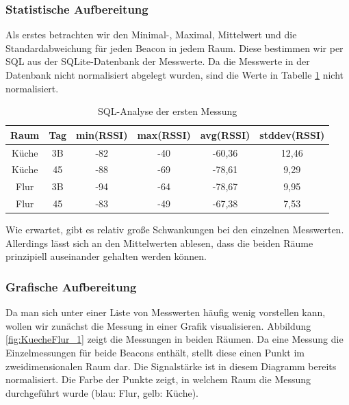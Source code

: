 \subsubsection{Statistische Aufbereitung}

Als erstes betrachten wir den Minimal-, Maximal, Mittelwert und die Standardabweichung für jeden
Beacon in jedem Raum. Diese bestimmen wir per SQL aus der SQLite-Datenbank der Messwerte.
Da die Messwerte in der Datenbank nicht normalisiert abgelegt wurden, sind die Werte
in Tabelle \ref{tab:sql-analyze} nicht normalisiert.

\begin{table}[h]
	\caption{SQL-Analyse der ersten Messung}
	\label{tab:sql-analyze}
	\begin{tabular}{|c|c|c|c|c|c|}
		\hline \textbf{Raum} & \textbf{Tag} & \textbf{min(RSSI)} & \textbf{max(RSSI)} & \textbf{avg(RSSI)} & \textbf{stddev(RSSI)} \\
		\hline 
		\hline Küche  & 3B & -82 & -40 & -60,36 & 12,46 \\ 
		\hline Küche & 45 & -88 & -69 & -78,61 & 9,29 \\ 
		\hline Flur & 3B & -94 & -64 & -78,67 & 9,95 \\ 
		\hline Flur & 45 & -83 & -49 & -67,38 & 7,53 \\ 
		\hline 
	\end{tabular}
\end{table}


\vspace{0.4cm}
Wie erwartet, gibt es relativ große Schwankungen bei den einzelnen Messwerten.
Allerdings lässt sich an den Mittelwerten ablesen, dass die beiden Räume
prinzipiell auseinander gehalten werden können.

\subsubsection{Grafische Aufbereitung}
\label{sec:lok-grafische-aufbereitung}

Da man sich unter einer Liste von Messwerten häufig wenig vorstellen kann,
wollen wir zunächst die Messung in einer Grafik visualisieren.
Abbildung \ref{fig:KuecheFlur_1} zeigt die Messungen in beiden Räumen.
Da eine Messung die Einzelmessungen für beide Beacons enthält, stellt diese
einen Punkt im zweidimensionalen Raum dar. Die Signalstärke ist in diesem
Diagramm bereits normalisiert. Die Farbe der Punkte zeigt, in welchem Raum
die Messung durchgeführt wurde (blau: Flur, gelb: Küche).

